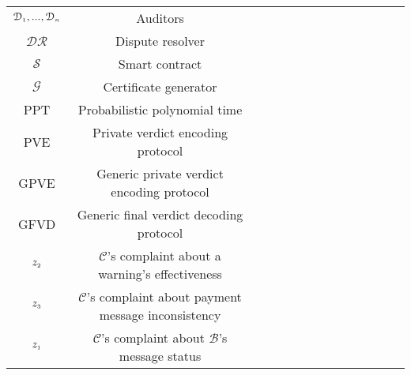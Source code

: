 \begin{table}[!htbp]
\begin{scriptsize}
\begin{center}
{{\begin{tabular}{|c|c|c|c|c|c|c|c|c|c|c|c|c|c|}
%  
\cellcolor{gray!20}\scriptsize$\mathcal{D}_{\scriptscriptstyle 1},... , \mathcal{D}_{\scriptscriptstyle n}$ &\cellcolor{gray!20}\scriptsize Auditors  \\  
%
\cellcolor{white!20}\scriptsize$\mathcal{DR}$ &\cellcolor{white!20}\scriptsize Dispute resolver  \\  
%
\cellcolor{gray!20}\scriptsize$\mathcal{S}$ &\cellcolor{gray!20}\scriptsize Smart contract  \\  
%
\cellcolor{white!20}\scriptsize$\mathcal{G}$ &\cellcolor{white!20}\scriptsize Certificate generator  \\  
%
%
\cellcolor{gray!20}\scriptsize PPT&\cellcolor{gray!20}\scriptsize  Probabilistic polynomial time \\    
%
\cellcolor{white!20}\scriptsize{PVE} &\cellcolor{white!20}\scriptsize  Private verdict encoding  protocol\\ 
%
%
\cellcolor{white!20}\scriptsize{GPVE} &\cellcolor{white!20}\scriptsize  Generic private verdict encoding protocol\\ 
%
\cellcolor{gray!20}\scriptsize{GFVD} &\cellcolor{gray!20}\scriptsize  Generic final verdict decoding protocol\\ 
%

%
\cellcolor{white!20}\scriptsize$z_{\scriptscriptstyle 2}$ &\cellcolor{white!20}\scriptsize  $\mathcal{C}$'s complaint about a warning's effectiveness\\
%

%
%
%


% 
\cellcolor{gray!20}\scriptsize$z_{\scriptscriptstyle 3}$ &\cellcolor{gray!20}\scriptsize  $\mathcal{C}$'s complaint about payment message  inconsistency\\ 
%
\cellcolor{white!20}\scriptsize$z_{\scriptscriptstyle 1}$ &\cellcolor{white!20}\scriptsize  $\mathcal{C}$'s complaint about $\mathcal{B}$'s message status\\ 


\end{tabular}}}
\end{center}
\end{scriptsize}
\end{table}
